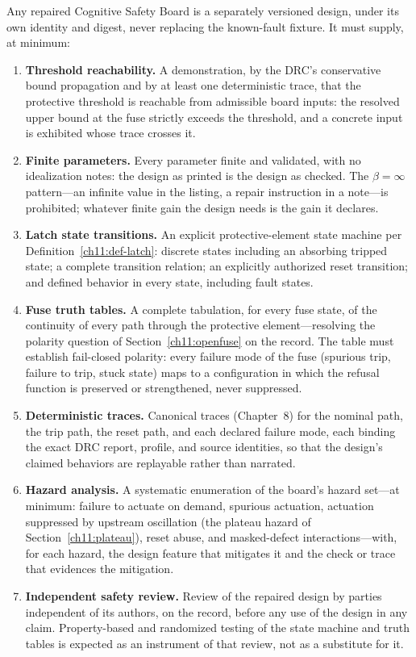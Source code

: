 \begin{ruleenv}\label{ch11:rule-repair}
Any repaired Cognitive Safety Board is a separately versioned design, under its own identity and digest, never replacing the known-fault fixture. It must supply, at minimum:
\begin{enumerate}
\item \textbf{Threshold reachability.} A demonstration, by the DRC's conservative bound propagation and by at least one deterministic trace, that the protective threshold is reachable from admissible board inputs: the resolved upper bound at the fuse strictly exceeds the threshold, and a concrete input is exhibited whose trace crosses it.
\item \textbf{Finite parameters.} Every parameter finite and validated, with no idealization notes: the design as printed is the design as checked. The $\beta=\infty$ pattern---an infinite value in the listing, a repair instruction in a note---is prohibited; whatever finite gain the design needs is the gain it declares.
\item \textbf{Latch state transitions.} An explicit protective-element state machine per Definition~\ref{ch11:def-latch}: discrete states including an absorbing tripped state; a complete transition relation; an explicitly authorized reset transition; and defined behavior in every state, including fault states.
\item \textbf{Fuse truth tables.} A complete tabulation, for every fuse state, of the continuity of every path through the protective element---resolving the polarity question of Section~\ref{ch11:openfuse} on the record. The table must establish fail-closed polarity: every failure mode of the fuse (spurious trip, failure to trip, stuck state) maps to a configuration in which the refusal function is preserved or strengthened, never suppressed.
\item \textbf{Deterministic traces.} Canonical traces (Chapter~8) for the nominal path, the trip path, the reset path, and each declared failure mode, each binding the exact DRC report, profile, and source identities, so that the design's claimed behaviors are replayable rather than narrated.
\item \textbf{Hazard analysis.} A systematic enumeration of the board's hazard set---at minimum: failure to actuate on demand, spurious actuation, actuation suppressed by upstream oscillation (the plateau hazard of Section~\ref{ch11:plateau}), reset abuse, and masked-defect interactions---with, for each hazard, the design feature that mitigates it and the check or trace that evidences the mitigation.
\item \textbf{Independent safety review.} Review of the repaired design by parties independent of its authors, on the record, before any use of the design in any claim. Property-based and randomized testing of the state machine and truth tables \cite{quickcheck} is expected as an instrument of that review, not as a substitute for it.
\end{enumerate}
\end{ruleenv}

